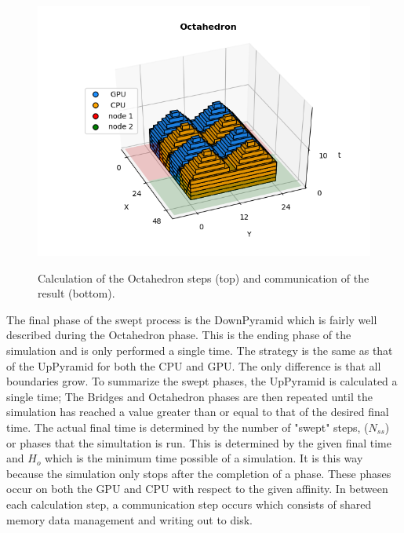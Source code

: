 \documentclass[review]{elsarticle}
\begin{document}
\begin{figure}[h!]
    \centering
       \includegraphics{figs/Octahedron2.png}%
    \label{fig:OCT}
    \caption{Calculation of the Octahedron steps (top) and communication of the result (bottom).}
\end{figure}

\par The final phase of the swept process is the DownPyramid which is fairly well described during the Octahedron phase. This is the ending phase of the simulation and is only performed a single time. The strategy is the same as that of the UpPyramid for both the CPU and GPU. The only difference is that all boundaries grow. To summarize the swept phases, the UpPyramid is calculated a single time; The Bridges and Octahedron phases are then repeated until the simulation has reached a value greater than or equal to that of the desired final time.
The actual final time is determined by the number of "swept" steps, ($N_{ss}$) or phases that the simultation is run. This is determined by the given final time and $H_{o}$ which is the minimum time possible of a simulation. It is this way because the simulation only stops after the completion of a phase. These phases occur on both the GPU and CPU with respect to the given affinity. In between each calculation step, a communication step occurs  which consists of shared memory data management and writing out to disk.
\end{document}
